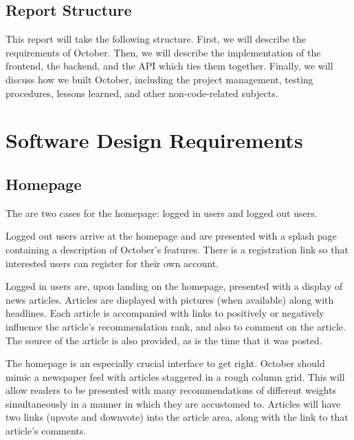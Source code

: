 \documentclass[11pt,letterpaper]{article}
\begin{document}
\subsection{Report Structure}
This report will take the following structure. First, we will describe the requirements of October.
Then, we will describe the implementation of the frontend, the backend, and the API which ties them together.
Finally, we will discuss how we built October, including the project management, testing procedures, lessons learned, and other non-code-related subjects.

\section{Software Design Requirements}

\subsection{Homepage}
\label{sec:homepagerequirements}
The are two cases for the homepage: logged in users and logged out users.

Logged out users arrive at the homepage and are presented with a splash page containing a description of October's features.
There is a registration link so that interested users can register for their own account.

Logged in users are, upon landing on the homepage, presented with a display of news articles.
Articles are displayed with pictures (when available) along with headlines.
Each article is accompanied with links to positively or negatively influence the article's recommendation rank, and also to comment on the article.
The source of the article is also provided, as is the time that it was posted.

The homepage is an especially crucial interface to get right.
October should mimic a newspaper feel with articles staggered in a rough column grid.
This will allow readers to be presented with many recommendations of different weights simultaneously in a manner in which they are accustomed to.
Articles will have two links (upvote and downvote) into the article area, along with the link to that article's comments.
\end{document}
